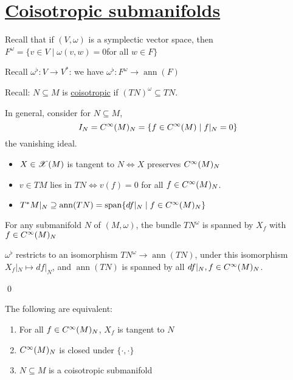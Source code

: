 \documentclass[x11names,reqno,14pt]{extarticle}
\DeclareMathOperator{\ann}{ann}
\DeclareMathOperator{\Span}{span}
\begin{document}
\section*{\underline{Coisotropic submanifolds}}

Recall that if $(V,\omega)$ is a symplectic vector space, then $F^\omega = \{v\in V \mid \omega(v, w) = 0 $for all $w\in F\}$

Recall $\omega^\flat:V\to V^*$: we have $\omega^\flat:F^\omega\to \ann(F)$

Recall: $N\subseteq M$ is \underline{coisotropic} if $(TN)^\omega \subseteq TN$. 

In general, consider for $N \subseteq M$, 
\[
I_N = C^\infty(M)_N = \{f\in C^\infty(M) \mid f|_N = 0\}
\]
the vanishing ideal. 

\begin{itemize}

\item $X \in \mathscr{X}(M)$ is tangent to $N \iff X$ preserves $C^\infty(M)_N$

\item $v\in TM$ lies in $TN \iff v(f) = 0$ for all $f \in C^\infty(M)_N$.

\item $T^*M|_N \supseteq \ann(TN) = \Span\{df|_N\mid f \in C^\oo(M)_N\}$

\end{itemize}

\lem

For any submanifold $N$ of $(M,\omega)$, the bundle $TN^\omega$ is spanned by $X_f$ with $f \in C^\infty(M)_N$

\proof

$\omega^\flat$ restricts to an isomorphism $TN^\omega \to \ann(TN)$, under this isomorphism $X_f|_N \mapsto df|_N$, and $\ann(TN)$ is spanned by all $df|_N, f\in C^\infty(M)_N$.

\qed

\thm

The following are equivalent:
\begin{enumerate}

\item For all $f \in C^\infty(M)_N$, $X_f$ is tangent to $N$

\item $C^\infty(M)_N$ is closed under $\{\cdot,\cdot\}$

\item $N\subseteq M$ is a coisotropic submanifold

\end{enumerate}
\end{document}
